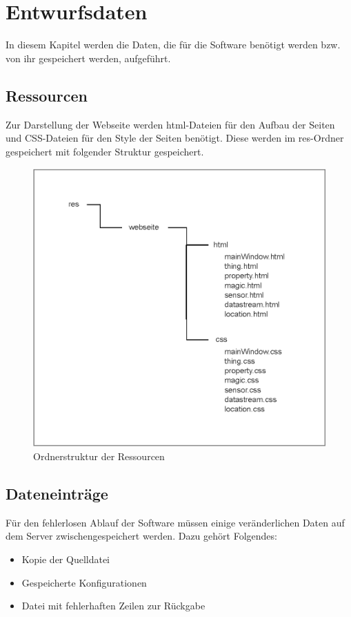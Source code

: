 \section{Entwurfsdaten}

In diesem Kapitel werden die Daten, die für die Software benötigt werden bzw. von ihr gespeichert werden, aufgeführt.

\subsection{Ressourcen}
Zur Darstellung der Webseite werden html-Dateien für den Aufbau der Seiten und CSS-Dateien für den Style der Seiten benötigt.
Diese werden im res-Ordner gespeichert mit folgender Struktur gespeichert.

\begin{figure}[htbp]
\centering
\includegraphics[scale=0.8]{uml/resources.eps}
\caption{Ordnerstruktur der Ressourcen}
\end{figure}

\subsection{Dateneinträge}
Für den fehlerlosen Ablauf der Software müssen einige veränderlichen Daten auf dem Server zwischengespeichert werden.
Dazu gehört Folgendes:
\begin{itemize}
\item Kopie der Quelldatei
\item Gespeicherte Konfigurationen
\item Datei mit fehlerhaften Zeilen zur Rückgabe
\end{itemize}